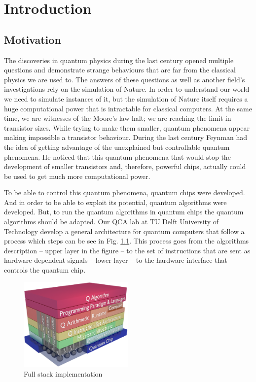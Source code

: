
\chapter{Introduction}
\label{sec:org76eb342}
\section{Motivation}
\label{sec:org37e5d53}
The discoveries in quantum physics during the last century opened multiple questions and demonstrate strange behaviours that are far from the classical physics we are used to.
The answers of these questions as well as another field's investigations rely on the simulation of Nature.
In order to understand our world we need to simulate instances of it, but the simulation of Nature itself requires a huge computational power that is intractable for classical computers.
At the same time, we are witnesses of the Moore's law halt; we are reaching the limit in transistor sizes.
While trying to make them smaller, quantum phenomena appear making impossible a transistor behaviour.
During the last century Feynman had the idea of getting advantage of the unexplained but controllable quantum phenomena.
He noticed that this quantum phenomena that would stop the development of smaller transistors and, therefore, powerful chips, actually could be used to get much more computational power.


To be able to control this quantum phenomena, quantum chips were developed.
And in order to be able to exploit its potential, quantum algorithms were developed.
But, to run the quantum algorithms in quantum chips the quantum algorithms should be adapted.
Our QCA lab at TU Delft University of Technology develop a general architecture for quantum computers \cite{Fu_2016} that follow a process which steps can be see in Fig. \ref{fig:system_stack}.
This process goes from the algorithms description -- upper layer in the figure -- to the set of instructions that are sent as hardware dependent signals  -- lower layer -- to the hardware interface that controls the quantum chip.


\begin{figure}[htbp]
\centering
\includegraphics[width=0.5\textwidth]{figures/system_stack.png}
\caption{\label{fig:system_stack}
Full stack implementation \cite{Fu:2017:EMS:3123939.3123952}}
\end{figure}

